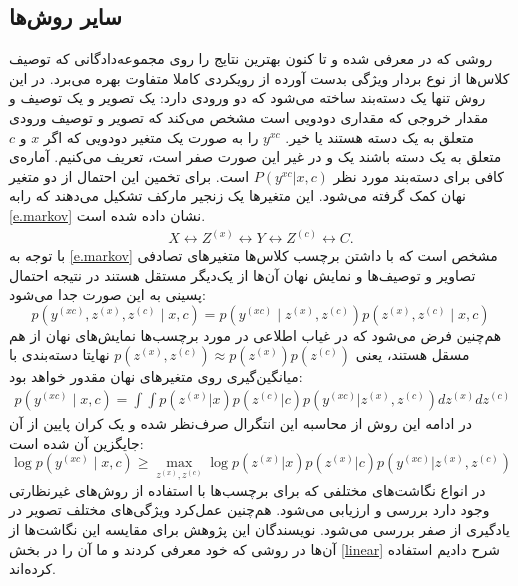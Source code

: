 \subsection{سایر روش‌ها}\label{other}
روشی که در \cite{ agnostic}  معرفی شده و تا کنون بهترین نتایج را روی مجموعه‌دادگانی که توصیف کلاس‌ها از نوع بردار ویژگی بدست آورده از رویکردی کاملا متفاوت بهره می‌برد. در این روش تنها یک دسته‌بند ساخته می‌شود که دو ورودی دارد: یک تصویر و یک توصیف و مقدار خروجی که مقداری دودویی است مشخص می‌کند که تصویر و توصیف ورودی متعلق به یک دسته هستند یا خیر. $y^{xc}$ را به صورت یک متغیر دودویی که اگر $x$ و $c$ متعلق به یک دسته باشند یک و در غیر این صورت صفر است، تعریف می‌کنیم. آماره‌ی کافی برای دسته‌بند مورد نظر $ P(y^{xc} | x,c)$ است. برای تخمین این احتمال از دو متغیر نهان کمک گرفته می‌شود. این متغیرها یک زنجیر مارکف تشکیل می‌دهند که رابه \eqref{e.markov} نشان داده شده است. 
\begin{align} \label{e.markov}
X \leftrightarrow Z^{(x)} \leftrightarrow Y  \leftrightarrow Z^{(c)} \leftrightarrow C.
\end{align}
با توجه به \eqref{e.markov} مشخص است که با داشتن برچسب کلاس‌ها متغیرهای تصادفی تصاویر و توصیف‌ها و نمایش نهان آن‌ها از یک‌دیگر مستقل هستند در نتیجه احتمال پسینی به این صورت جدا می‌شود: 
\begin{equation}
p(y^{(xc)}, {z}^{(x)}, {z}^{(c)} \mid {x}, {c}) = p(y^{(xc)} \mid {z}^{(x)}, {z}^{(c)}) p({z}^{(x)}, {z}^{(c)} \mid {x}, {c}) \nonumber
\end{equation}
هم‌چنین فرض می‌شود که در غیاب اطلاعی در مورد برچسب‌ها نمایش‌های نهان از هم مسقل هستند، یعنی
  $p({z}^{(x)}, {z}^{(c)}) \approx p({z}^{(x)})p({z}^{(c)})$
نهایتا دسته‌بندی با میانگین‌گیری روی متغیرهای نهان مقدور خواهد بود:
\begin{align} \label{eqn:p} 
p( y^{(xc)} \mid {x}, {c})
=\int\int p({z}^{(x)}|{x})p({z}^{(c)}|{c})p(y^{(xc)}|{z}^{(x)}, {z}^{(c)})d{z}^{(x)}d{z}^{(c)} 
\end{align}
در ادامه این روش از محاسبه این انتگرال صرف‌نظر شده و یک کران پایین از آن جایگزین آن شده است:
\begin{equation}\label{eqn:lb}
\log p( y^{(xc)} \mid x, c) 
 \geq \max_{{z}^{(x)},{z}^{(c)}}  \log p({z}^{(x)}|x)p({z}^{(x)}|c)p(y^{(xc)}|{z}^{(x)}, {z}^{(c)})
\end{equation}
 در \cite{ Akata15} انواع نگاشت‌های مختلفی که برای برچسب‌ها با استفاده از روش‌های غیرنظارتی وجود دارد بررسی و ارزیابی می‌شود. هم‌چنین عمل‌کرد ویژگی‌های مختلف تصویر در یادگیری از صفر بررسی می‌شود. نویسندگان این پژوهش برای مقایسه این نگاشت‌ها از آن‌ها در روشی که خود معرفی کردند \cite{ akata13} و ما آن را در بخش \ref{linear} شرح دادیم استفاده کرده‌اند. 
 
